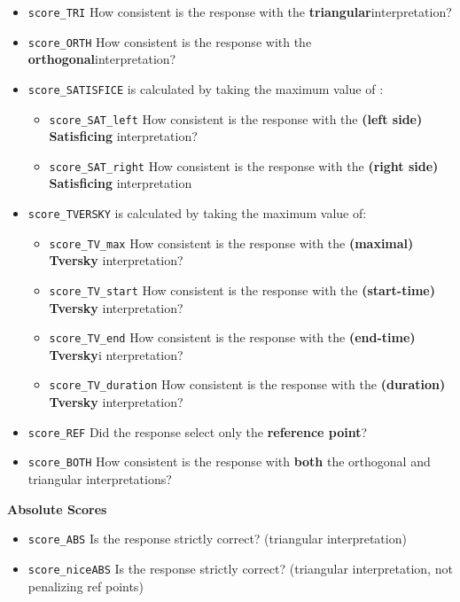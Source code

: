 \documentclass[
  letterpaper,
  DIV=11,
  numbers=noendperiod]{scrreprt}
\providecommand{\tightlist}{%
  \setlength{\itemsep}{0pt}\setlength{\parskip}{0pt}}\usepackage{longtable,booktabs,array}
\begin{document}
\begin{itemize}
\tightlist
\item
  \texttt{score\_TRI} How consistent is the response with the
  \textbf{triangular}interpretation?
\item
  \texttt{score\_ORTH} How consistent is the response with the
  \textbf{orthogonal}interpretation?
\item
  \texttt{score\_SATISFICE} is calculated by taking the maximum value of
  :

  \begin{itemize}
  \item
    \texttt{score\_SAT\_left} How consistent is the response with the
    \textbf{(left side) Satisficing} interpretation?
  \item
    \texttt{score\_SAT\_right} How consistent is the response with the
    \textbf{(right side) Satisficing} interpretation
  \end{itemize}
\item
  \texttt{score\_TVERSKY} is calculated by taking the maximum value of:

  \begin{itemize}
  \item
    \texttt{score\_TV\_max} How consistent is the response with the
    \textbf{(maximal) Tversky} interpretation?
  \item
    \texttt{score\_TV\_start} How consistent is the response with the
    \textbf{(start-time) Tversky} interpretation?
  \item
    \texttt{score\_TV\_end} How consistent is the response with the
    \textbf{(end-time) Tversky}i nterpretation?
  \item
    \texttt{score\_TV\_duration} How consistent is the response with the
    \textbf{(duration) Tversky} interpretation?
  \end{itemize}
\item
  \texttt{score\_REF} Did the response select only the \textbf{reference
  point}?
\item
  \texttt{score\_BOTH} How consistent is the response with \textbf{both}
  the orthogonal and triangular interpretations?
\end{itemize}

\textbf{Absolute Scores}

\begin{itemize}
\tightlist
\item
  \texttt{score\_ABS} Is the response strictly correct? (triangular
  interpretation)
\item
  \texttt{score\_niceABS} Is the response strictly correct? (triangular
  interpretation, not penalizing ref points)
\end{itemize}
\end{document}
